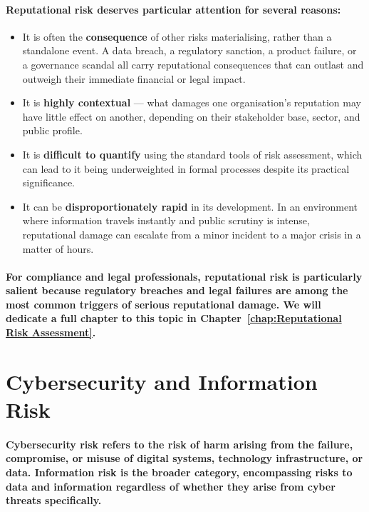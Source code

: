 \paragraph{Reputational risk deserves particular attention for several reasons:}
\begin{itemize}
  \item{It is often the \textbf{consequence} of other risks materialising, rather than a standalone event. A data breach, a regulatory sanction, a product failure, or a governance scandal all carry reputational consequences that can outlast and outweigh their immediate financial or legal impact.}
  \item{It is \textbf{highly contextual} — what damages one organisation's reputation may have little effect on another, depending on their stakeholder base, sector, and public profile.}
  \item{It is \textbf{difficult to quantify} using the standard tools of risk assessment, which can lead to it being underweighted in formal processes despite its practical significance.}
  \item{It can be \textbf{disproportionately rapid} in its development. In an environment where information travels instantly and public scrutiny is intense, reputational damage can escalate from a minor incident to a major crisis in a matter of hours.}
\end{itemize}
\paragraph{For compliance and legal professionals, reputational risk is particularly salient because regulatory breaches and legal failures are among the most common triggers of serious reputational damage. We will dedicate a full chapter to this topic in Chapter~\ref{chap:Reputational Risk Assessment}.}

\section{Cybersecurity and Information Risk}
\paragraph{\textbf{Cybersecurity risk} refers to the risk of harm arising from the failure, compromise, or misuse of digital systems, technology infrastructure, or data. \textbf{Information risk} is the broader category, encompassing risks to data and information regardless of whether they arise from cyber threats specifically.}

